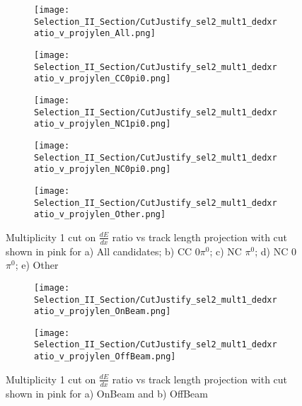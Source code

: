 \begin{figure}[H]
\centering
  \begin{subfigure}[t]{0.36\textwidth}
    \centering
\texttt{[image: Selection\_II\_Section/CutJustify\_sel2\_mult1\_dedxratio\_v\_projylen\_All.png]}    
  \caption{ }
  \end{subfigure} 
  \hspace{10 mm}
  \begin{subfigure}[t]{0.36\textwidth}
    \centering
\texttt{[image: Selection\_II\_Section/CutJustify\_sel2\_mult1\_dedxratio\_v\_projylen\_CC0pi0.png]}
  \caption{ }
  \end{subfigure} 
  \hspace{5 mm}
  \begin{subfigure}[t]{0.36\textwidth}
    \centering
\texttt{[image: Selection\_II\_Section/CutJustify\_sel2\_mult1\_dedxratio\_v\_projylen\_NC1pi0.png]}
  \caption{ }
  \end{subfigure} 
  \hspace{10 mm}
  \begin{subfigure}[t]{0.36\textwidth}
    \centering
\texttt{[image: Selection\_II\_Section/CutJustify\_sel2\_mult1\_dedxratio\_v\_projylen\_NC0pi0.png]}
  \caption{ }
  \end{subfigure} 
  \hspace{5 mm}
  \begin{subfigure}[t]{0.36\textwidth}
    \centering
\texttt{[image: Selection\_II\_Section/CutJustify\_sel2\_mult1\_dedxratio\_v\_projylen\_Other.png]}
  \caption{ }
  \end{subfigure}
  
\caption{Multiplicity 1 cut on $\frac{dE}{dx}$ ratio vs track length projection with cut shown in pink for a) All candidates; b) CC 0$\pi^0$; c) NC $\pi^0$; d) NC 0$\pi^0$; e) Other }
\label{fig:cutjust_sel2_mult1_dedxratio_v_leny}
\end{figure}

\begin{figure}[H]
\centering
\begin{subfigure}[t]{0.36\textwidth}
  \centering
  \texttt{[image: Selection\_II\_Section/CutJustify\_sel2\_mult1\_dedxratio\_v\_projylen\_OnBeam.png]}  
  \caption{ }
  \end{subfigure} 
  \hspace{10 mm}
  \begin{subfigure}[t]{0.36\textwidth}
    \centering
\texttt{[image: Selection\_II\_Section/CutJustify\_sel2\_mult1\_dedxratio\_v\_projylen\_OffBeam.png]}
  \caption{ }
  \end{subfigure} 
\caption{Multiplicity 1 cut on $\frac{dE}{dx}$ ratio vs track length projection with cut shown in pink for a) OnBeam and b) OffBeam }
\label{fig:cutjust_sel2_onbeam_mult1_dedxratio_v_leny}

\end{figure}

